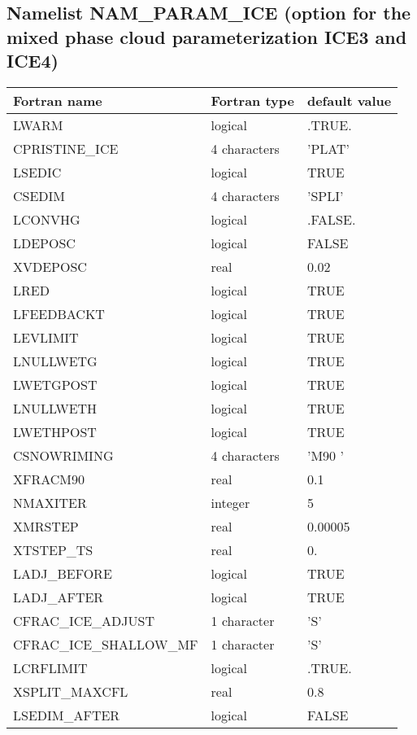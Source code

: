
\subsection{Namelist NAM\_PARAM\_ICE (option for the mixed phase cloud 
parameterization ICE3 and ICE4)}
%
\begin{center}
\begin{tabular} {|l|l|l|}
\hline
Fortran name & Fortran type & default value \\
\hline
LWARM         &  logical     & .TRUE. \\
CPRISTINE\_ICE & 4 characters & 'PLAT' \\
LSEDIC & logical & TRUE \\
CSEDIM & 4 characters & 'SPLI' \\
LCONVHG       &  logical     & .FALSE. \\
LDEPOSC& logical & FALSE \\
XVDEPOSC& real & 0.02 \\
LRED & logical & TRUE \\
LFEEDBACKT & logical & TRUE \\
LEVLIMIT & logical & TRUE \\
LNULLWETG & logical & TRUE \\
LWETGPOST & logical & TRUE \\
 LNULLWETH & logical & TRUE \\
LWETHPOST & logical & TRUE \\
CSNOWRIMING & 4 characters & 'M90 ' \\
XFRACM90 & real & 0.1 \\
NMAXITER & integer & 5 \\
XMRSTEP & real & 0.00005 \\
XTSTEP\_TS & real & 0. \\
LADJ\_BEFORE & logical & TRUE \\
LADJ\_AFTER & logical & TRUE \\
CFRAC\_ICE\_ADJUST  & 1 character & 'S' \\
CFRAC\_ICE\_SHALLOW\_MF& 1 character & 'S' \\
LCRFLIMIT &  logical     & .TRUE. \\
XSPLIT\_MAXCFL& real & 0.8 \\
LSEDIM\_AFTER & logical & FALSE \\
\hline
\end{tabular}
\end{center}

